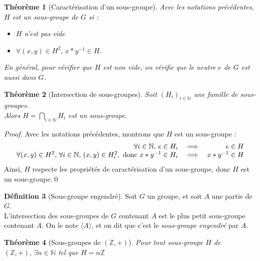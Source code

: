 \documentclass[11pt,a4paper]{report}
\newtheorem{theorem}{Théorème}[chapter]
\newtheorem{itheorem}[theorem]{Théorème}
\theoremstyle{definition}
\newtheorem{dfn}[theorem]{Définition}
\begin{document}
\begin{itheorem}[Caractérisation d'un sous-groupe]
     Avec les notations précédentes, $H$ est un sous-groupe de $G$ si : 
     \begin{itemize}
         \item $H$ n'est pas vide
         \item $\forall (x,y) \in H^2,\, x*y^{-1} \in H$.
     \end{itemize}
     En général, pour vérifier que $H$ est non vide, on vérifie que le neutre $e$ de $G$ est aussi dans $G$.
\end{itheorem}
\begin{theorem}[Intersection de sous-groupes]
     Soit $\left( H_i \right)_{i\in \mathbb{N}}$ une famille de sous-groupes.\\
     Alors $H=\bigcap_{i\in \mathbb{N}} H_i$ est un sous-groupe.
\end{theorem}
\begin{proof}
     Avec les notations précédentes, montrons que $H$ est un sous-groupe : 
     \[
     \begin{array}{r c r}
         \forall i\in \mathbb{N},\, e\in H_i &\implies & e\in H \\
         \forall (x,y)\in H^2,\, \forall i\in \mathbb{N},\, (x,y)\in H_i^2,\text{ donc }x*y^{-1}\in H_i & \implies & x*y^{-1}\in H
     \end{array}
     \]
     Ainsi, $H$ respecte les propriétés de caractérisation d'un sous-groupe, donc $H$ est un sous-groupe.\qed
\end{proof}
\begin{dfn}[Sous-groupe engendré]
     Soit $G$ un groupe, et soit $A$ une partie de $G$. \\
     L'intersection des sous-groupes de $G$ contenant $A$ est le plus petit sous-groupe contenant $A$. On le note $\langle A \rangle$, et on dit que c'est le \emph{sous-groupe engendré} par $A$.
\end{dfn}
\begin{itheorem}[Sous-groupes de $\left( \mathbb{Z},+ \right) $]\label{thm:sous_groupe_de_Z}
     Pour tout sous-groupe $H$ de $\left( \mathbb{Z},+ \right),\,\exists n\in \mathbb{N}$ tel que $H=n\mathbb{Z}$
\end{itheorem}
\end{document}
